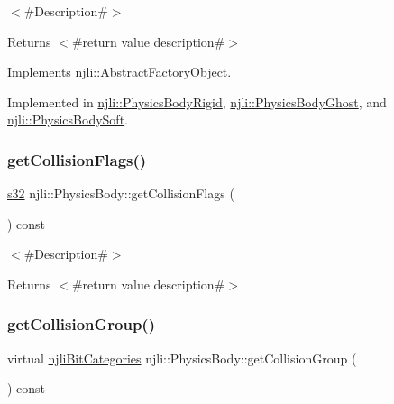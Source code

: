 $<$\#\+Description\#$>$

\begin{DoxyReturn}{Returns}
$<$\#return value description\#$>$ 
\end{DoxyReturn}


Implements \mbox{\hyperlink{classnjli_1_1_abstract_factory_object_af4151e41b80d5bc3fc42822c67fc2278}{njli\+::\+Abstract\+Factory\+Object}}.



Implemented in \mbox{\hyperlink{classnjli_1_1_physics_body_rigid_a13a8810e9ddca12e83bbbe6676e8c906}{njli\+::\+Physics\+Body\+Rigid}}, \mbox{\hyperlink{classnjli_1_1_physics_body_ghost_aa04661e7cd05271931351076c53991b2}{njli\+::\+Physics\+Body\+Ghost}}, and \mbox{\hyperlink{classnjli_1_1_physics_body_soft_a1d3ad459c9527251dfdef541ae44c850}{njli\+::\+Physics\+Body\+Soft}}.

\mbox{\label{classnjli_1_1_physics_body_a4be49988e50146b12c149bf66bb51230}} 
\subsubsection{\texorpdfstring{get\+Collision\+Flags()}{getCollisionFlags()}}
{\footnotesize\ttfamily \mbox{\hyperlink{_util_8h_aa62c75d314a0d1f37f79c4b73b2292e2}{s32}} njli\+::\+Physics\+Body\+::get\+Collision\+Flags (\begin{DoxyParamCaption}{ }\end{DoxyParamCaption}) const}

$<$\#\+Description\#$>$

\begin{DoxyReturn}{Returns}
$<$\#return value description\#$>$ 
\end{DoxyReturn}
\mbox{\label{classnjli_1_1_physics_body_a58fdc56103d9aa37f477d7a09d5a91ef}} 
\subsubsection{\texorpdfstring{get\+Collision\+Group()}{getCollisionGroup()}}
{\footnotesize\ttfamily virtual \mbox{\hyperlink{namespacenjli_af7b302a2b48bb644f85c88080925c974}{njli\+Bit\+Categories}} njli\+::\+Physics\+Body\+::get\+Collision\+Group (\begin{DoxyParamCaption}{ }\end{DoxyParamCaption}) const\hspace{0.3cm}{\ttfamily [virtual]}}

